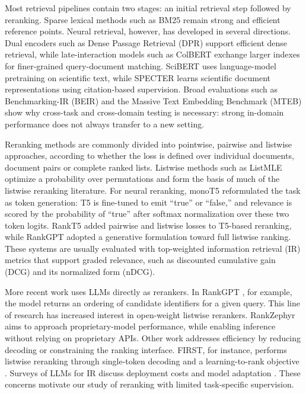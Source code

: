 \documentclass[pdflatex,sn-basic,Numbered]{sn-jnl}%
\theoremstyle{thmstyleone}%
\theoremstyle{thmstyletwo}%
\theoremstyle{thmstylethree}%
\begin{document}
Most retrieval pipelines contain two stages: an initial retrieval step followed by
reranking. Sparse lexical methods such as BM25 remain strong and efficient
reference points. Neural retrieval, however, has developed in several directions.
Dual encoders such as Dense Passage Retrieval (DPR) \cite{Karpukhin} support
efficient dense retrieval, while late-interaction models such as ColBERT
\cite{Khattab} exchange larger indexes for finer-grained query-document matching.
SciBERT \cite{Beltagy} uses language-model pretraining on scientific
text, while SPECTER \cite{Cohan} learns scientific document
representations using citation-based supervision. Broad evaluations
such as Benchmarking-IR (BEIR) \cite{Thakur} and the Massive Text Embedding
Benchmark (MTEB) \cite{Muennighoff} show why cross-task and cross-domain testing
is necessary: strong in-domain performance does not always transfer to a new
setting.

Reranking methods are commonly divided into pointwise, pairwise and listwise
approaches, according to whether the loss is defined over individual documents,
document pairs or complete ranked lists. Listwise methods such as ListMLE
\cite{Xia} optimize a probability over permutations and form the basis of much of the
listwise reranking literature. For neural reranking, monoT5 \cite{Nogueira}
reformulated the task as token generation: T5 is fine-tuned to emit ``true'' or
``false,'' and relevance is scored by the probability of ``true'' after softmax
normalization over these two token logits. RankT5
\cite{Zhuang} added pairwise and listwise losses to T5-based reranking, while RankGPT \cite{Sun} adopted a generative formulation
toward full listwise ranking. These systems are usually evaluated with top-weighted
information retrieval (IR) metrics that support graded relevance, such as
discounted cumulative gain (DCG) and its normalized form (nDCG).

More recent work uses LLMs directly as rerankers. In RankGPT \cite{Sun}, for
example, the model returns an ordering of candidate identifiers for a given query.
This line of research has increased interest in open-weight listwise
rerankers. RankZephyr \cite{Pradeep} aims to approach proprietary-model
performance, while enabling inference without relying on proprietary APIs. Other work
addresses efficiency by reducing decoding or constraining the ranking interface.
FIRST, for instance, performs listwise reranking through single-token decoding and
a learning-to-rank objective \cite{Reddy}. Surveys of LLMs for IR discuss
deployment costs and model adaptation \cite{Zhu}. These concerns motivate our
study of reranking with limited task-specific supervision.
\end{document}
